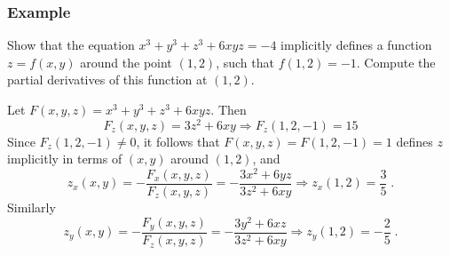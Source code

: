 \begin{frame}
  \frametitle{Example}

  Show that the equation $x^3+y^3+z^3+6xyz =-4$ implicitly defines a function $z=f(x,y)$ around the point $(1,2)$, such that $f(1,2) = -1$. Compute the partial derivatives of this function at $(1,2)$.

\pause
\medskip

Let $F(x,y,z) = x^3+y^3+z^3+6xyz$. Then
%
$$F_z(x,y,z) = 3z^2 + 6xy  \Longrightarrow F_z(1,2,-1) = 15$$
%
\pause Since $F_z(1,2,-1) \neq 0$, it follows that $F(x,y,z) = F(1,2,-1) = 1$ defines $z$ implicitly in terms of $(x,y)$ around $(1,2)$, and
%
$$z_x(x,y) = -\frac{F_x(x,y,z)}{F_z(x,y,z)} = -\frac{3x^2 + 6yz}{3z^2 + 6xy} \Longrightarrow z_x(1,2) = \frac{3}{5}\; .$$
%
\pause Similarly
%
$$z_y(x,y) = -\frac{F_y(x,y,z)}{F_z(x,y,z)} = -\frac{3y^2 + 6xz}{3z^2 + 6xy} \Longrightarrow z_y(1,2) = -\frac{2}{5}\; .$$

\end{frame}